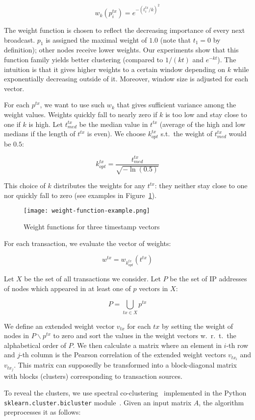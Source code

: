 \[
w_k(p^{tx}_i) = e^{-(t^{tx}_i/k)^2}
\]

The weight function is chosen to reflect the decreasing importance of every next broadcast.
$p_1$ is assigned the maximal weight of $1.0$ (note that $t_1=0$ by definition); other nodes receive lower weights.
Our experiments show that this function family yields better clustering (compared to $1/(kt)$ and $e^{-kt}$).
The intuition is that it gives higher weights to a certain window depending on $k$ while exponentially decreasing outside of it.
Moreover, window size is adjusted for each vector.

For each $p^{tx}$, we want to use such $w_k$ that gives sufficient variance among the weight values.
Weights quickly fall to nearly zero if $k$ is too low and stay close to one if $k$ is high.
Let $t^{tx}_{med}$ be the median value in $t^{tx}$ (average of the high and low medians if the length of $t^{tx}$ is even).
We choose $k^{tx}_{opt}$ s.t.~the weight of $t^{tx}_{med}$ would be $0.5$:

\[
k^{tx}_{opt} = \frac{t^{tx}_{med}}{\sqrt{-\ln(0.5)}}
\]

This choice of $k$ distributes the weights for any $t^{tx}$: they neither stay close to one nor quickly fall to zero (see examples in Figure~\ref{fig:weight}).
\begin{figure}
	\centering
	\texttt{[image: weight-function-example.png]}
	\caption{Weight functions for three timestamp vectors}\label{fig:weight}
\end{figure}
For each transaction, we evaluate the vector of weights:

\[
w^{tx} = w_{k^{tx}_{opt}}(t^{tx})
\]

Let $X$ be the set of all transactions we consider.
Let $P$ be the set of IP addresses of nodes which appeared in at least one of $p$ vectors in $X$:

\[
P = \bigcup\limits_{tx \in X} p^{tx}
\]

We define an extended weight vector $v_{tx}$ for each $tx$ by setting the weight of nodes in $P \backslash p^{tx}$ to zero and sort the values in the weight vectors w.~r.~t.~the alphabetical order of $P$.
We then calculate a matrix where an element in $i$-th row and $j$-th column is the Pearson correlation of the extended weight vectors $v_{tx_i}$ and $v_{tx_j}$.
This matrix can supposedly be transformed into a block-diagonal matrix with blocks (clusters) corresponding to transaction sources.

To reveal the clusters, we use spectral co-clustering~\cite{Dhillon2001} implemented in the Python \texttt{sklearn.cluster.bicluster} module~\cite{scikitlearn2018}.
Given an input matrix $A$, the algorithm preprocesses it as follows:

